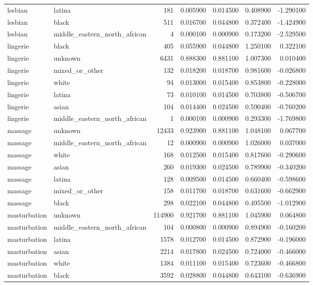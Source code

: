 \begin{tabular}{llrrrrr}
lesbian & latina & 181 & 0.005900 & 0.014500 & 0.408900 & -1.290100 \\
lesbian & black & 511 & 0.016700 & 0.044800 & 0.372400 & -1.424900 \\
lesbian & middle_eastern_north_african & 4 & 0.000100 & 0.000900 & 0.173200 & -2.529500 \\
lingerie & black & 405 & 0.055900 & 0.044800 & 1.250100 & 0.322100 \\
lingerie & unknown & 6431 & 0.888300 & 0.881100 & 1.007300 & 0.010400 \\
lingerie & mixed_or_other & 132 & 0.018200 & 0.018700 & 0.981600 & -0.026800 \\
lingerie & white & 94 & 0.013000 & 0.015400 & 0.853800 & -0.228000 \\
lingerie & latina & 73 & 0.010100 & 0.014500 & 0.703800 & -0.506700 \\
lingerie & asian & 104 & 0.014400 & 0.024500 & 0.590400 & -0.760200 \\
lingerie & middle_eastern_north_african & 1 & 0.000100 & 0.000900 & 0.293300 & -1.769800 \\
massage & unknown & 12433 & 0.923900 & 0.881100 & 1.048100 & 0.067700 \\
massage & middle_eastern_north_african & 12 & 0.000900 & 0.000900 & 1.026000 & 0.037000 \\
massage & white & 168 & 0.012500 & 0.015400 & 0.817600 & -0.290600 \\
massage & asian & 260 & 0.019300 & 0.024500 & 0.789900 & -0.340200 \\
massage & latina & 128 & 0.009500 & 0.014500 & 0.660400 & -0.598600 \\
massage & mixed_or_other & 158 & 0.011700 & 0.018700 & 0.631600 & -0.662900 \\
massage & black & 298 & 0.022100 & 0.044800 & 0.495500 & -1.012900 \\
masturbation & unknown & 114900 & 0.921700 & 0.881100 & 1.045900 & 0.064800 \\
masturbation & middle_eastern_north_african & 104 & 0.000800 & 0.000900 & 0.894900 & -0.160200 \\
masturbation & latina & 1578 & 0.012700 & 0.014500 & 0.872900 & -0.196000 \\
masturbation & asian & 2214 & 0.017800 & 0.024500 & 0.724000 & -0.466000 \\
masturbation & white & 1384 & 0.011100 & 0.015400 & 0.723600 & -0.466800 \\
masturbation & black & 3592 & 0.028800 & 0.044800 & 0.643100 & -0.636900 \\

\end{tabular}
